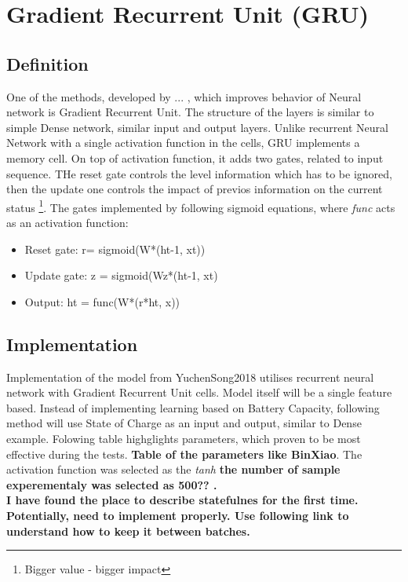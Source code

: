 \section{Gradient Recurrent Unit (GRU)}\label{sec:GRU}
\subsection{Definition}
    One of the methods, developed by ... , which improves behavior of Neural network is Gradient Recurrent Unit.
    The structure of the layers is similar to simple Dense network, similar input and output layers.
    Unlike recurrent Neural Network with a single activation function in the cells, GRU implements a memory cell.
    On top of activation function, it adds two gates, related to input sequence.
    THe reset gate controls the level information which has to be ignored, then the update one controls the impact of previos information on the current status \footnote{Bigger value - bigger impact}.
    The gates implemented by following sigmoid equations, where \textit{func} acts as an activation function:
    \begin{itemize}
        \item Reset gate: r= sigmoid(W*(ht-1, xt))
        \item Update gate: z = sigmoid(Wz*(ht-1, xt)
        \item Output: ht = func(W*(r*ht, x))
    \end{itemize}
\subsection{Implementation}
    Implementation of the model from YuchenSong2018 utilises recurrent neural network with Gradient Recurrent Unit cells. 
    Model itself will be a single feature based.
    Instead of implementing learning based on Battery Capacity, following method will use State of Charge as an input and output, similar to Dense example. Folowing table highglights parameters, which proven to be most effective during the tests.  \textbf{Table of the parameters like BinXiao}. The activation function was selected as the \textit{tanh} \textbf{the number of sample experementaly was selected as 500?? .} \\
    \textbf{I have found the place to describe statefulnes for the first time. Potentially, need to implement properly. Use following link to understand how to keep it between batches.}
    
    